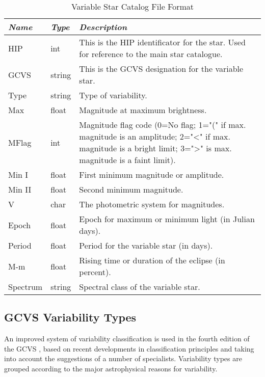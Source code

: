 \begin{table}[tb]
\begin{tabularx}{\textwidth}{l|l|X}\toprule
\emph{Name} & \emph{Type} & \emph{Description}\\\midrule
HIP      & int    & This is the HIP identificator for the star. Used for reference to the main star catalogue.\\%
GCVS     & string & This is the GCVS designation for the variable star.\\%
Type     & string & Type of variability.\\%
Max      & float  & Magnitude at maximum brightness.\\%
MFlag    & int    & Magnitude flag code (0=No flag; 1="(" if max. magnitude is an amplitude; 
                    2="\textless{}" if max. magnitude is a bright limit; 
                    3="\textgreater{}" is max. magnitude is a faint limit).\\%
Min I    & float  & First minimum magnitude or amplitude.\\%
Min II   & float  & Second minimum magnitude.\\%
V        & char   & The photometric system for magnitudes.\\%
Epoch    & float  & Epoch for maximum or minimum light (in Julian days).\\%
Period   & float  & Period for the variable star (in days).\\%
M-m      & float  & Rising time or duration of the eclipse (in percent).\\%
Spectrum & string & Spectral class of the variable star.\\\bottomrule
\end{tabularx}
\caption{Variable Star Catalog File Format}
\label{tab:sec:StarCatalogues:VariableStars}
\end{table}

\subsection{GCVS Variability Types}\label{gcvs-variability-types}

An improved system of variability classification is used in the fourth
edition of the GCVS%
, based on recent developments in classification
principles and taking into account the suggestions of a number of
specialists. Variability types are grouped according to the major
astrophysical reasons for variability.


